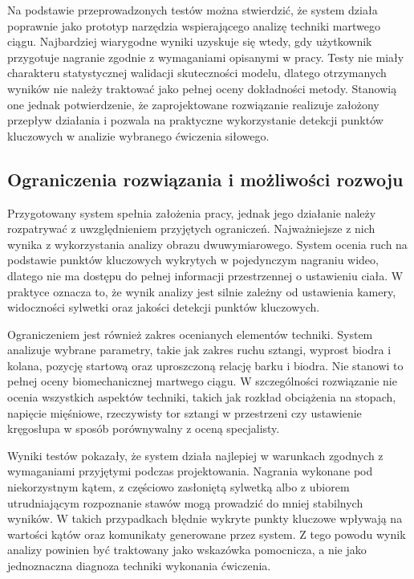 Na podstawie przeprowadzonych testów można stwierdzić, że system działa poprawnie jako prototyp narzędzia wspierającego analizę techniki martwego ciągu. Najbardziej wiarygodne wyniki uzyskuje się wtedy, gdy użytkownik przygotuje nagranie zgodnie z wymaganiami opisanymi w pracy. Testy nie miały charakteru statystycznej walidacji skuteczności modelu, dlatego otrzymanych wyników nie należy traktować jako pełnej oceny dokładności metody. Stanowią one jednak potwierdzenie, że zaprojektowane rozwiązanie realizuje założony przepływ działania i pozwala na praktyczne wykorzystanie detekcji punktów kluczowych w analizie wybranego ćwiczenia siłowego.

\subsection*{Ograniczenia rozwiązania i możliwości rozwoju}

Przygotowany system spełnia założenia pracy, jednak jego działanie należy rozpatrywać z uwzględnieniem przyjętych ograniczeń. Najważniejsze z nich wynika z wykorzystania analizy obrazu dwuwymiarowego. System ocenia ruch na podstawie punktów kluczowych wykrytych w pojedynczym nagraniu wideo, dlatego nie ma dostępu do pełnej informacji przestrzennej o ustawieniu ciała. W praktyce oznacza to, że wynik analizy jest silnie zależny od ustawienia kamery, widoczności sylwetki oraz jakości detekcji punktów kluczowych.

Ograniczeniem jest również zakres ocenianych elementów techniki. System analizuje wybrane parametry, takie jak zakres ruchu sztangi, wyprost biodra i kolana, pozycję startową oraz uproszczoną relację barku i biodra. Nie stanowi to pełnej oceny biomechanicznej martwego ciągu. W szczególności rozwiązanie nie ocenia wszystkich aspektów techniki, takich jak rozkład obciążenia na stopach, napięcie mięśniowe, rzeczywisty tor sztangi w przestrzeni czy ustawienie kręgosłupa w sposób porównywalny z oceną specjalisty.

Wyniki testów pokazały, że system działa najlepiej w warunkach zgodnych z wymaganiami przyjętymi podczas projektowania. Nagrania wykonane pod niekorzystnym kątem, z częściowo zasłoniętą sylwetką albo z ubiorem utrudniającym rozpoznanie stawów mogą prowadzić do mniej stabilnych wyników. W takich przypadkach błędnie wykryte punkty kluczowe wpływają na wartości kątów oraz komunikaty generowane przez system. Z tego powodu wynik analizy powinien być traktowany jako wskazówka pomocnicza, a nie jako jednoznaczna diagnoza techniki wykonania ćwiczenia.

